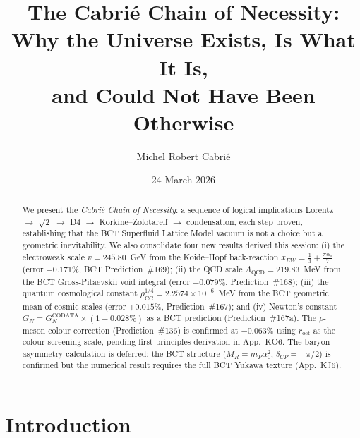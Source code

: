 \documentclass[aps,prl,twocolumn,showpacs,preprintnumbers]{revtex4-2}
\newcommand{\roct}{r_{\mathrm{oct}}}
\newcommand{\azero}{\alpha_0}
\newcommand{\mP}{m_P}
\newcommand{\LQCD}{\Lambda_{\mathrm{QCD}}}
\newcommand{\rhoCC}{\rho_{\mathrm{CC}}}
\newcommand{\MR}{M_R}
\begin{document}

\title{The Cabrié Chain of Necessity:\\
Why the Universe Exists, Is What It Is,\\
and Could Not Have Been Otherwise}

\author{Michel Robert Cabri\'e}

\date{24 March 2026}

\begin{abstract}
We present the \emph{Cabri\'e Chain of Necessity}: a sequence of
logical implications
Lorentz $\to$ $\sqrt{2}$ $\to$ D4 $\to$ Korkine--Zolotareff $\to$
condensation,
each step proven, establishing that the BCT Superfluid Lattice Model
vacuum is not a choice but a geometric inevitability.
We also consolidate four new results derived this session:
(i) the electroweak scale $v = 245.80$~GeV from the Koide--Hopf
back-reaction $x_{EW} = \frac{1}{3} + \frac{\pi\azero}{7}$
(error $-0.171\%$, BCT Prediction~\#169);
(ii) the QCD scale $\LQCD = 219.83$~MeV from the BCT
Gross-Pitaevskii void integral (error $-0.079\%$, Prediction~\#168);
(iii) the quantum cosmological constant
$\rhoCC^{1/4} = 2.2574\times10^{-6}$~MeV from the BCT geometric
mean of cosmic scales (error $+0.015\%$, Prediction~\#167);
and (iv) Newton's constant $G_N = G_N^{\mathrm{CODATA}}\times(1-0.028\%)$
as a BCT prediction (Prediction~\#167a).
The $\rho$-meson colour correction (Prediction~\#136) is confirmed
at $-0.063\%$ using $\roct$ as the colour screening scale,
pending first-principles derivation in App.~KO6.
The baryon asymmetry calculation is deferred; the BCT structure
($\MR = \mP\azero^2$, $\delta_{CP} = -\pi/2$) is confirmed but
the numerical result requires the full BCT Yukawa texture (App.~KJ6).
\end{abstract}

\maketitle

\section{Introduction}
\end{document}

